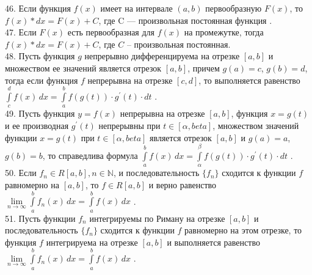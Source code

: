\documentclass[12pt]{article}
\begin{document}
46. Если функция ${\displaystyle f(x)}$ имеет на интервале ${\displaystyle (a,b)}$ первообразную ${\displaystyle F(x)}$, то ${\displaystyle f(x)*dx = F(x) + C }$, где C — произвольная постоянная функция .\\

47. Если ${\displaystyle F(x)}$ есть первообразная для ${\displaystyle f(x)}$ на промежутке, тогда ${\displaystyle f(x)*dx = F(x) + C }$, где ${\displaystyle C}$ – произвольная постоянная.\\

48. Пусть функция ${\displaystyle g}$ непрерывно дифференцируема на отрезке ${\displaystyle [a,b]}$ и множеством ее значений является отрезок ${\displaystyle [a,b]}$, причем ${\displaystyle g(a)=c}$, ${\displaystyle g(b)=d}$, тогда если функция ${\displaystyle f}$ непрерывна на отрезке ${\displaystyle [c,d]}$, то выполняется равенство ${\displaystyle \int \limits _{c}^{d} f(x)\,dx=\int \limits _{a}^{b} f(g(t))\cdot g^{\prime}(t)\cdot dt}$ .\\

49. Пусть функция ${\displaystyle y = f(x)}$ непрерывна на отрезке ${\displaystyle [a,b]}$, функция ${\displaystyle x = g(t)}$ и ее производная ${\displaystyle g^{\prime}(t)}$ непрерывны при ${\displaystyle t \in [\alpha,beta]}$, множеством значений функции ${\displaystyle x = g(t)}$ при ${\displaystyle t \in [\alpha,beta]}$ является отрезок ${\displaystyle [a,b]}$ и ${\displaystyle g(a) = a}$, ${\displaystyle g(b) = b}$, то справедлива формула ${\displaystyle \int \limits _{a}^{b} f(x)\,dx=\int \limits _{\alpha}^{\beta} f(g(t))\cdot g^{\prime}(t)\cdot dt}$ .\\

50. Если ${\displaystyle f_n \in R[a,b], n \in \mathbb{N}}$, и последовательность ${\displaystyle \{f_n\}}$ сходится к функции ${\displaystyle f}$ равномерно на ${\displaystyle [a,b]}$, то ${\displaystyle f \in R[a,b]}$ и верно равенство ${\displaystyle \lim \limits _{n \to \infty} \int \limits _{a}^{b} f_n(x)\,dx=\int \limits _{a}^{b} f(x)\,dx}$ .\\

51. Пусть функции ${\displaystyle f_n}$ интегрируемы по Риману на отрезке ${\displaystyle [a,b]}$ и последовательность ${\displaystyle \{f_n\}}$ сходится к функции ${\displaystyle f}$ равномерно на этом отрезке, то функция ${\displaystyle f}$  интегрируема на отрезке ${\displaystyle [a,b]}$ и выполняется равенство ${\displaystyle \lim \limits _{n \to \infty} \int \limits _{a}^{b} f_n(x)\,dx=\int \limits _{a}^{b} f(x)\,dx}$ .\\
\end{document}
